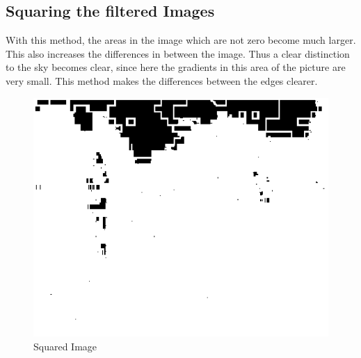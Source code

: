 \documentclass{article}
\begin{document}
	\subsection{Squaring the filtered Images}
	With this method, the areas in the image which are not zero become much larger. This also increases the differences in between the image.
	Thus a clear distinction to the sky becomes clear, since here the gradients in this area of the picture are very small. 
	This method makes the differences between the edges clearer.
	\begin{figure}[!h]
		\center
		\caption{Squared Image}
		\includegraphics{I2.png}
	\end{figure}
\end{document}
